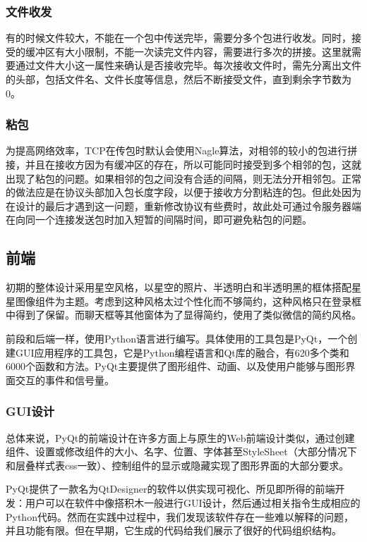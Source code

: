 \documentclass[12pt]{article} %
\begin{document}
\begin{sloppypar}
\subsubsection{文件收发}

有的时候文件较大，不能在一个包中传送完毕，需要分多个包进行收发。同时，接受的缓冲区有大小限制，不能一次读完文件内容，需要进行多次的拼接。这里就需要通过文件大小这一属性来确认是否接收完毕。每次接收文件时，需先分离出文件的头部，包括文件名、文件长度等信息，然后不断接受文件，直到剩余字节数为0。


\subsubsection{粘包}

为提高网络效率，TCP在传包时默认会使用Nagle算法，对相邻的较小的包进行拼接，并且在接收方因为有缓冲区的存在，所以可能同时接受到多个相邻的包，这就出现了粘包的问题。如果相邻的包之间没有合适的间隔，则无法分开相邻包。正常的做法应是在协议头部加入包长度字段，以便于接收方分割粘连的包。但此处因为在设计的最后才遇到这一问题，重新修改协议有些费时，故此处可通过令服务器端在向同一个连接发送包时加入短暂的间隔时间，即可避免粘包的问题。

\subsection{前端}

初期的整体设计采用星空风格，以星空的照片、半透明白和半透明黑的框体搭配星星图像组件为主题。考虑到这种风格太过个性化而不够简约，这种风格只在登录框中得到了保留。而聊天框等其他窗体为了显得简约，使用了类似微信的简约风格。

前段和后端一样，使用Python语言进行编写。具体使用的工具包是PyQt，一个创建GUI应用程序的工具包，它是Python编程语言和Qt库的融合，有620多个类和6000个函数和方法。PyQt主要提供了图形组件、动画、以及使用户能够与图形界面交互的事件和信号量。

\subsubsection{GUI设计}

总体来说，PyQt的前端设计在许多方面上与原生的Web前端设计类似，通过创建组件、设置或修改组件的大小、名字、位置、字体甚至StyleSheet（大部分情况下和层叠样式表css一致）、控制组件的显示或隐藏实现了图形界面的大部分要求。

PyQt提供了一款名为QtDesigner的软件以供实现可视化、所见即所得的前端开发：用户可以在软件中像搭积木一般进行GUI设计，然后通过相关指令生成相应的Python代码。然而在实践中过程中，我们发现该软件存在一些难以解释的问题，并且功能有限。但在早期，它生成的代码给我们展示了很好的代码组织结构。


\end{sloppypar}
\end{document}
